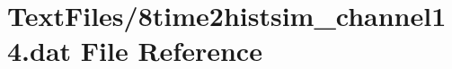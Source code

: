 \hypertarget{8time2histsim__channel14_8dat}{}\section{Text\+Files/8time2histsim\+\_\+channel14.dat File Reference}
\label{8time2histsim__channel14_8dat}
